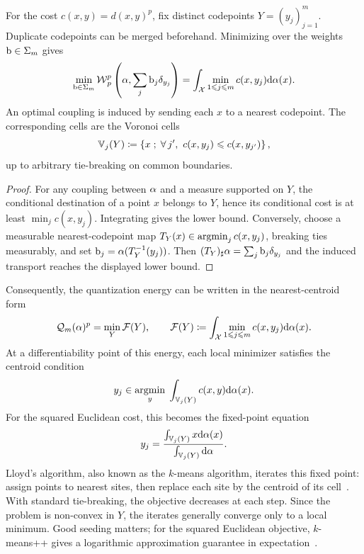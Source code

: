 \begin{prop}\label{prop-free-masses-voronoi}
	For the cost $c(x,y)=d(x,y)^p$, fix distinct codepoints $Y=(y_j)_{j=1}^m$. Duplicate codepoints can be merged beforehand. Minimizing over the weights $\mathrm{b}\in\Sigma_m$ gives
	\[
		\min_{\mathrm{b}\in\Sigma_m}
		\operatorname{\mathcal{W}}_p^p\left(\alpha,\sum_j \mathrm{b}_j\delta_{y_j}\right)
		=
		\int_{\mathcal{X}} \min_{1\leqslant j\leqslant m} c(x,y_j)\mathrm{d}\alpha(x).
	\]
	An optimal coupling is induced by sending each $x$ to a nearest codepoint. The corresponding cells are the Voronoi cells
	\[
		\mathbb{V}_j(Y)
		\coloneqq
		\left\{ x \;;\; \forall \, j',\ c(x,y_j)\leqslant c(x,y_{j'}) \right\},
	\]
	up to arbitrary tie-breaking on common boundaries.
\end{prop}
\begin{proof}
	For any coupling between $\alpha$ and a measure supported on $Y$, the conditional destination of a point $x$ belongs to $Y$, hence its conditional cost is at least $\min_j c(x,y_j)$. Integrating gives the lower bound. Conversely, choose a measurable nearest-codepoint map $T_Y(x)\in\operatorname{argmin}_j c(x,y_j)$, breaking ties measurably, and set $\mathrm{b}_j=\alpha(T_Y^{-1}(y_j))$. Then $(T_Y)_\sharp\alpha=\sum_j \mathrm{b}_j\delta_{y_j}$ and the induced transport reaches the displayed lower bound.
\end{proof}

Consequently, the quantization energy can be written in the nearest-centroid form
\[
	\mathcal{Q}_m(\alpha)^p
	=
	\min_Y \mathcal{F}(Y),
	\qquad
	\mathcal{F}(Y)
	\coloneqq
	\int_{\mathcal{X}} \min_{1\leqslant j\leqslant m} c(x,y_j)\mathrm{d}\alpha(x).
\]
At a differentiability point of this energy, each local minimizer satisfies the centroid condition
\[
	y_j
	\in
	\underset{y}{\operatorname{argmin}}\;
	\int_{\mathbb{V}_j(Y)} c(x,y)\mathrm{d}\alpha(x).
\]
For the squared Euclidean cost, this becomes the fixed-point equation
\[
	y_j
	=
	\frac{\int_{\mathbb{V}_j(Y)} x\mathrm{d}\alpha(x)}
	{\int_{\mathbb{V}_j(Y)} \mathrm{d}\alpha}.
\]
Lloyd's algorithm, also known as the $k$-means algorithm, iterates this fixed point: assign points to nearest sites, then replace each site by the centroid of its cell~\cite{Lloyd82}. With standard tie-breaking, the objective decreases at each step. Since the problem is non-convex in $Y$, the iterates generally converge only to a local minimum. Good seeding matters; for the squared Euclidean objective, $k$-means++ gives a logarithmic approximation guarantee in expectation~\cite{ArthurVassilvitskii2007}.

